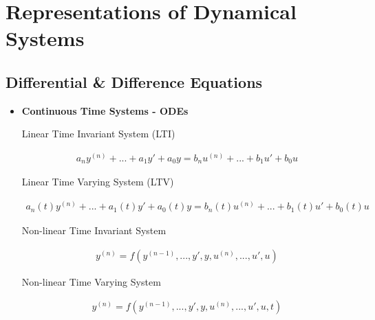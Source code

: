 \documentclass[12pt,oneside]{amsart}
\begin{document}
\newpage

\section{Representations of Dynamical Systems}

\vspace{12pt}

\subsection{Differential \& Difference Equations }

\vspace{12pt}

\begin{itemize}

\item \textbf{Continuous Time Systems - ODEs}

\vspace{12pt}

Linear Time Invariant System (LTI)

\begin{align*}
a_n  y^{(n)} + ... + a_1 y' + a_0 y = b_{n}  u^{(n)} + ... + b_1 u' + b_0 u 
\end{align*}

\vspace{12pt}

Linear Time Varying System (LTV)

\begin{align*}
a_n(t)  y^{(n)} + ... + a_1(t) y' + a_0(t) y = b_{n}(t)  u^{(n)} + ... + b_1(t) u' + b_0(t) u 
\end{align*}

\vspace{12pt}

Non-linear Time Invariant System

\begin{align*}
y^{(n)} = f(y^{(n-1)}, ..., y', y, u^{(n)},  ... , u' , u)
\end{align*}

\vspace{12pt}

Non-linear Time Varying System

\begin{align*}
y^{(n)} = f(y^{(n-1)}, ..., y', y, u^{(n)},  ... , u' , u, t)
\end{align*}

\vspace{12pt}


\end{itemize}
\end{document}
